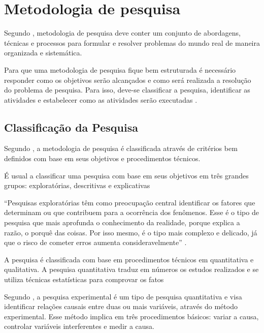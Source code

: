 \chapter{Metodologia de pesquisa}

Segundo \cite[pág.~2]{rodrigues2007}, metodologia de pesquisa deve conter um conjunto de abordagens, técnicas e processos para formular e resolver problemas do mundo real de maneira organizada e sistemática.

Para que uma metodologia de pesquisa fique bem estruturada é necessário responder como os objetivos serão alcançados e  como será realizada a resolução do problema de pesquisa. Para isso, deve-se classificar a pesquisa, identificar as atividades e estabelecer como as atividades serão executadas \cite{forcon2014}.

\section{Classificação da Pesquisa}

Segundo \cite[pág.~41]{gil2008}, a metodologia de pesquisa é classificada através de critérios bem definidos com base em seus objetivos e procedimentos técnicos.

 É usual a classificar uma pesquisa com base em seus objetivos em três grandes grupos: exploratórias, descritivas e explicativas \cite[pág.~41]{gil2008}

\begin{citacao}
“Pesquisas exploratórias têm como preocupação central identificar os fatores que determinam ou que contribuem para a ocorrência dos fenômenos. Esse é o tipo de pesquisa que mais aprofunda o conhecimento da realidade, porque explica a razão, o porquê das coisas. Por isso mesmo, é o tipo mais complexo e delicado, já que o risco de cometer erros aumenta consideravelmente” \cite[pág.~43]{gil2008}.
\end{citacao}

A pesquisa é classificada com base em procedimentos técnicos em quantitativa e qualitativa. A pesquisa quantitativa traduz em números os estudos realizados e se utiliza técnicas estatísticas para comprovar os fatos \cite[pág.~9]{rodrigues2007}

Segundo \cite[pág.~2]{bandeira2012}, a pesquisa experimental é um tipo de pesquisa quantitativa e visa identificar relações causais entre duas ou mais variáveis, através do método experimental. Esse método implica em três procedimentos básicos: variar a causa, controlar variáveis interferentes e medir a causa.

